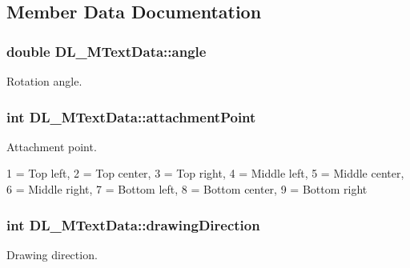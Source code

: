 \subsection{Member Data Documentation}
\hypertarget{structDL__MTextData_a339e3f5744ff0df98faf985b261b9d5a}{
\subsubsection[{angle}]{\setlength{\rightskip}{0pt plus 5cm}double D\-L\-\_\-\-M\-Text\-Data\-::angle}}\label{structDL__MTextData_a339e3f5744ff0df98faf985b261b9d5a}
Rotation angle. \hypertarget{structDL__MTextData_a24fb080330a5bc368c8573fa05a716f9}{
\subsubsection[{attachment\-Point}]{\setlength{\rightskip}{0pt plus 5cm}int D\-L\-\_\-\-M\-Text\-Data\-::attachment\-Point}}\label{structDL__MTextData_a24fb080330a5bc368c8573fa05a716f9}
Attachment point.

1 = Top left, 2 = Top center, 3 = Top right, 4 = Middle left, 5 = Middle center, 6 = Middle right, 7 = Bottom left, 8 = Bottom center, 9 = Bottom right \hypertarget{structDL__MTextData_a897d0a20cd617e6d2786cff6b7b34f42}{
\subsubsection[{drawing\-Direction}]{\setlength{\rightskip}{0pt plus 5cm}int D\-L\-\_\-\-M\-Text\-Data\-::drawing\-Direction}}\label{structDL__MTextData_a897d0a20cd617e6d2786cff6b7b34f42}
Drawing direction.

